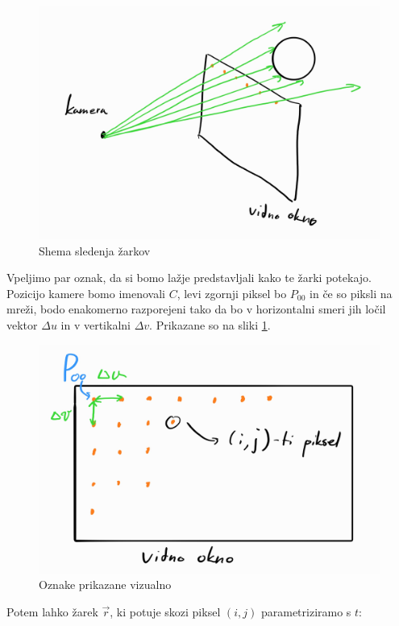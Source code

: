 \documentclass[12pt, a4paper]{article}
\begin{document}
\begin{figure}[H]
	\includegraphics[width=\textwidth]{shema_zarki}
	\caption{Shema sledenja žarkov}
\end{figure}

Vpeljimo par oznak, da si bomo lažje predstavljali kako te žarki potekajo. Pozicijo kamere bomo imenovali $C$,
levi zgornji piksel bo $P_{00}$ in če so piksli na mreži, bodo enakomerno razporejeni tako da bo v horizontalni
smeri jih ločil vektor $\Delta u$ in v vertikalni $\Delta v$. Prikazane so na sliki \ref{fig:oznake}.

\begin{figure}[h]
	\centering
	\includegraphics[width=\textwidth]{vidno_okno}
	\caption{Oznake prikazane vizualno}
	\label{fig:oznake}
\end{figure}

Potem lahko žarek $\vec{r}$, ki potuje skozi piksel $(i,j)$ parametriziramo s $t$:
\end{document}
